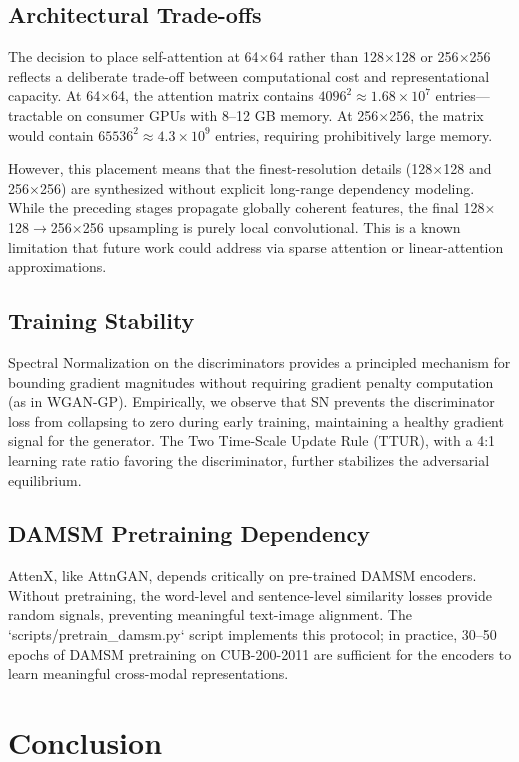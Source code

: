 \documentclass[conference]{IEEEtran}
\begin{document}
\subsection{Architectural Trade-offs}
The decision to place self-attention at 64$\times$64 rather than 128$\times$128 or 256$\times$256 reflects a deliberate trade-off between computational cost and representational capacity. At 64$\times$64, the attention matrix contains $4096^2 \approx 1.68 \times 10^7$ entries---tractable on consumer GPUs with 8--12 GB memory. At 256$\times$256, the matrix would contain $65536^2 \approx 4.3 \times 10^9$ entries, requiring prohibitively large memory.

However, this placement means that the finest-resolution details (128$\times$128 and 256$\times$256) are synthesized without explicit long-range dependency modeling. While the preceding stages propagate globally coherent features, the final 128$\times$128$\rightarrow$256$\times$256 upsampling is purely local convolutional. This is a known limitation that future work could address via sparse attention or linear-attention approximations.

\subsection{Training Stability}
Spectral Normalization on the discriminators provides a principled mechanism for bounding gradient magnitudes without requiring gradient penalty computation (as in WGAN-GP). Empirically, we observe that SN prevents the discriminator loss from collapsing to zero during early training, maintaining a healthy gradient signal for the generator. The Two Time-Scale Update Rule (TTUR), with a 4:1 learning rate ratio favoring the discriminator, further stabilizes the adversarial equilibrium.

\subsection{DAMSM Pretraining Dependency}
AttenX, like AttnGAN, depends critically on pre-trained DAMSM encoders. Without pretraining, the word-level and sentence-level similarity losses provide random signals, preventing meaningful text-image alignment. The `scripts/pretrain\_damsm.py` script implements this protocol; in practice, 30--50 epochs of DAMSM pretraining on CUB-200-2011 are sufficient for the encoders to learn meaningful cross-modal representations.

\section{Conclusion}
\label{sec:conclusion}
\end{document}
